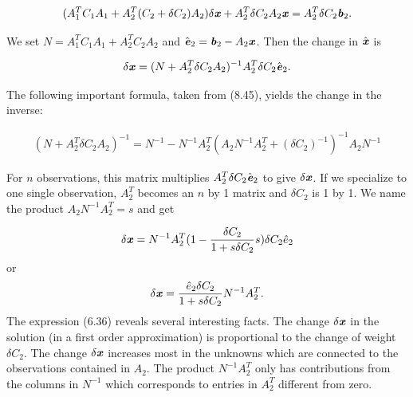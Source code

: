 \begin{align}
(A^{T}_{1}C_{1}A_{1}+A^{T}_{2}(C_{2}+\delta C_{2} )A_{2})\delta \textbf{\textit{x}} + A^{T}_{2}\delta C_{2}A_{2}\textbf{\textit{x}}=
A^{T}_{2}\delta C_{2}\textbf{\textit{b}}_{2}.
\end{align}
\begin{flushleft}
	We set  $ N= A^{T}_{1}C_{1}A_{1} + A^{T}_{2}C_{2}A_{2}$ and $ \hat{\textbf{\textit{e}}}_{2} = \textbf{\textit{b}}_{2} - A_{2}\textbf{\textit{x}}  $. Then the change in $\hat{\textbf{\textit{x}}}$ is
\end{flushleft}
\begin{align}
\delta \textbf{\textit{x}} = ( N + A^{T}_{2}\delta C_{2}A_{2})^{-1}
A^{T}_{2}\delta C_{2} \hat{\textbf{\textit{e}}}_{2}.
\end{align}
\begin{flushleft}
	The following important formula, taken from (8.45), yields the change in the inverse:
\end{flushleft}
\begin{align}
( N + A^{T}_{2}\delta C_{2}A_{2})^{-1} = N^{-1} - N^{-1}A^{T}_{2}
(A_{2}N^{-1}A^{T}_{2} +(\delta C_{2})^{-1} )^{-1} A_{2} N^{-1}
\end{align}
\begin{flushleft}
	For $n$ observations, this matrix multiplies  $ A^{T}_{2}\delta C_{2} \hat{\textbf{\textit{e}}}_{2} $ to give  $ \delta \textbf{\textit{x}} $. If we specialize to one single observation, $ A^{T}_{2} $ becomes an $n$ by 1 matrix and  $ \delta C_{2} $ is 1 by 1. We name the product  $ A_{2}N^{-1}A^{T}_{2} = s $ and get
\end{flushleft}
\begin{align*}
\delta \textbf{\textit{x}} = N^{-1} A^{T}_{2} (1-\dfrac{\delta C_{2}}{1+s\delta C_{2}}s)\delta C_{2}\hat{e}_{2}
\end{align*}
or
\begin{align}
\delta \textbf{\textit{x}} = \dfrac{\hat{e}_{2}\delta C_{2} }{1+s\delta C_{2}}N^{-1}A^{T}_{2}.
\end{align}
The expression (6.36) reveals several interesting facts. The change  $ \delta \textbf{\textit{x}} $  in the solution (in a first order approximation) is proportional to the change of weight $ \delta C_{2} $. The change $ \delta \textbf{\textit{x}} $ increases most in the unknowns which are connected to the observations contained in $A_{2}$. The product $ N^{-1}A^{T}_{2} $ only has contributions from the columns in $N^{-1}$ which corresponds to entries in $ A^{T}_{2} $ different from zero.

